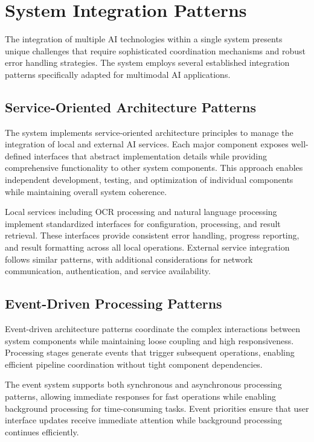 \section{System Integration Patterns}

The integration of multiple AI technologies within a single system presents unique challenges that require sophisticated coordination mechanisms and robust error handling strategies. The system employs several established integration patterns specifically adapted for multimodal AI applications.

\subsection{Service-Oriented Architecture Patterns}

The system implements service-oriented architecture principles to manage the integration of local and external AI services. Each major component exposes well-defined interfaces that abstract implementation details while providing comprehensive functionality to other system components. This approach enables independent development, testing, and optimization of individual components while maintaining overall system coherence.

Local services including OCR processing and natural language processing implement standardized interfaces for configuration, processing, and result retrieval. These interfaces provide consistent error handling, progress reporting, and result formatting across all local operations. External service integration follows similar patterns, with additional considerations for network communication, authentication, and service availability.

\subsection{Event-Driven Processing Patterns}

Event-driven architecture patterns coordinate the complex interactions between system components while maintaining loose coupling and high responsiveness. Processing stages generate events that trigger subsequent operations, enabling efficient pipeline coordination without tight component dependencies.

The event system supports both synchronous and asynchronous processing patterns, allowing immediate responses for fast operations while enabling background processing for time-consuming tasks. Event priorities ensure that user interface updates receive immediate attention while background processing continues efficiently.

